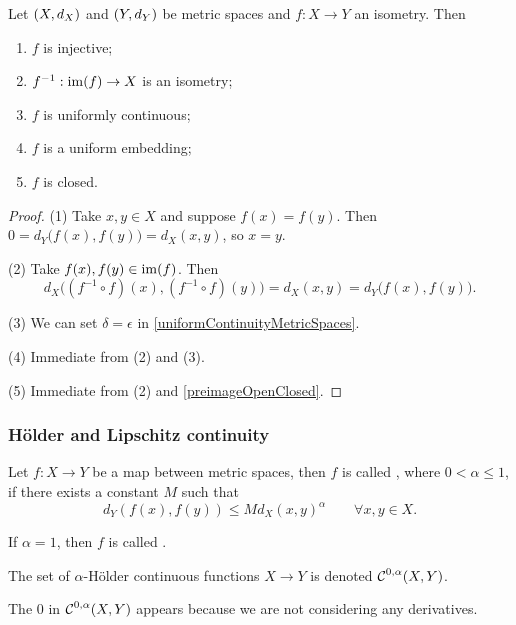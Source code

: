 \begin{lemma} \label{isometryLemma} \label{isometriesUniformlyContinuous}
Let $\sSet{X, d_X}$ and $\sSet{Y, d_Y}$ be metric spaces and $f:X\to Y$ an isometry. Then
\begin{enumerate}
\item $f$ is injective;
\item $f^{-1}: \operatorname{im}(f) \to X$ is an isometry;
\item $f$ is uniformly continuous;
\item $f$ is a uniform embedding;
\item $f$ is closed.
\end{enumerate}
\end{lemma}
\begin{proof}
(1) Take $x,y\in X$ and suppose $f(x) = f(y)$. Then $0 = d_Y\big(f(x), f(y)\big) = d_X(x,y)$, so $x = y$.

(2) Take $f(x),f(y)\in \operatorname{im}(f)$. Then
\[ d_X\big((f^{-1}\circ f)(x), (f^{-1}\circ f)(y)\big) = d_X(x,y) = d_Y\big(f(x), f(y)\big). \]

(3) We can set $\delta = \epsilon$ in \ref{uniformContinuityMetricSpaces}.

(4) Immediate from (2) and (3).

(5) Immediate from (2) and \ref{preimageOpenClosed}.
\end{proof}

\subsubsection{Hölder and Lipschitz continuity}
\begin{definition}
Let $f: X\to Y$ be a map between metric spaces, then $f$ is called , where $0 < \alpha \leq 1$, if there exists a constant $M$ such that
\[ d_Y(f(x), f(y)) \leq M d_X(x,y)^\alpha \qquad \forall x,y\in X. \]

If $\alpha = 1$, then $f$ is called .

The set of $\alpha$-Hölder continuous functions $X\to Y$ is denoted $\operatorname{\mathcal{C}}^{0,\alpha}(X,Y)$.
\end{definition}
The $0$ in $\operatorname{\mathcal{C}}^{0,\alpha}(X,Y)$ appears because we are not considering any derivatives.

